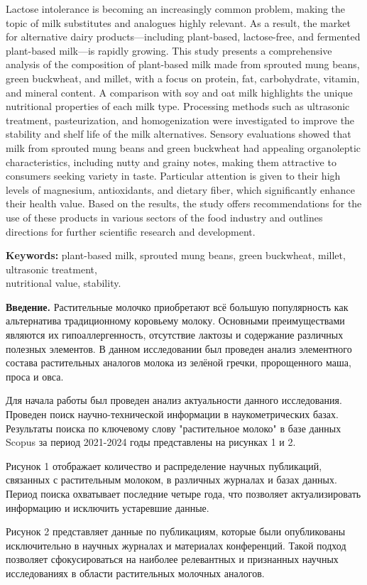 Lactose intolerance is becoming an increasingly common problem, making
the topic of milk substitutes and analogues highly relevant. As a
result, the market for alternative dairy products---including
plant-based, lactose-free, and fermented plant-based milk---is rapidly
growing. This study presents a comprehensive analysis of the composition
of plant-based milk made from sprouted mung beans, green buckwheat, and
millet, with a focus on protein, fat, carbohydrate, vitamin, and mineral
content. A comparison with soy and oat milk highlights the unique
nutritional properties of each milk type. Processing methods such as
ultrasonic treatment, pasteurization, and homogenization were
investigated to improve the stability and shelf life of the milk
alternatives. Sensory evaluations showed that milk from sprouted mung
beans and green buckwheat had appealing organoleptic characteristics,
including nutty and grainy notes, making them attractive to consumers
seeking variety in taste. Particular attention is given to their high
levels of magnesium, antioxidants, and dietary fiber, which
significantly enhance their health value. Based on the results, the
study offers recommendations for the use of these products in various
sectors of the food industry and outlines directions for further
scientific research and development.

{\bfseries Keywords:} plant-based milk, sprouted mung beans, green
buckwheat, millet, ultrasonic treatment, \\nutritional value, stability.

\begin{multicols}{2}
{\bfseries Введение.} Растительные молочко приобретают всё большую
популярность как альтернатива традиционному коровьему молоку. Основными
преимуществами являются их гипоаллергенность, отсутствие лактозы и
содержание различных полезных элементов. В данном исследовании был
проведен анализ элементного состава растительных аналогов молока из
зелёной гречки, пророщенного маша, проса и овса.

Для начала работы был проведен анализ актуальности данного исследования.
Проведен поиск научно-технической информации в наукометрических базах.
Результаты поиска по ключевому слову "растительное молоко" в базе данных
Scopus за период 2021-2024 годы представлены на рисунках 1 и 2.

Рисунок 1 отображает количество и распределение научных публикаций,
связанных с растительным молоком, в различных журналах и базах данных.
Период поиска охватывает последние четыре года, что позволяет
актуализировать информацию и исключить устаревшие данные.

Рисунок 2 представляет данные по публикациям, которые были опубликованы
исключительно в научных журналах и материалах конференций. Такой подход
позволяет сфокусироваться на наиболее релевантных и признанных научных
исследованиях в области растительных молочных аналогов.

\end{multicols}

